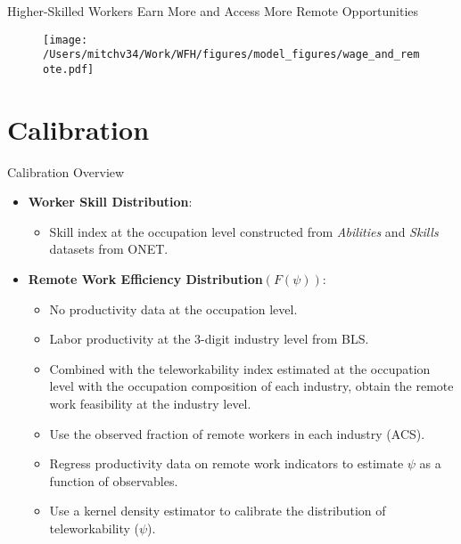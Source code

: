 \documentclass[aspectratio=1610]{beamer}
\begin{document}
\begin{frame}{Higher-Skilled Workers Earn More and Access More Remote Opportunities}
    \begin{figure}
        \centering
        \texttt{[image: /Users/mitchv34/Work/WFH/figures/model\_figures/wage\_and\_remote.pdf]}
    \end{figure}
\end{frame}

\section{Calibration}
\begin{frame}[label=calibration_overview]{Calibration Overview}
    \begin{itemize}
        \item \textbf{Worker Skill Distribution}:
        \begin{itemize}
            \item Skill index at the occupation level constructed from \textit{Abilities} and \textit{Skills} datasets from ONET.\hyperlink{appendix_worker_skill}{}
        \end{itemize}

        \item \textbf{Remote Work Efficiency Distribution}$(F(\psi))$:
        \begin{itemize}
            \item No productivity data at the occupation level.
            \item Labor productivity at the 3-digit industry level from BLS.
            \item Combined with the teleworkability index estimated at the occupation level with the occupation composition of each industry, obtain the remote work feasibility at the industry level.
            \item Use the observed fraction of remote workers in each industry (ACS).
            \item Regress productivity data on remote work indicators to estimate $\psi$ as a function of observables. \hyperlink{appendix_calibration_psi_details}{}
            \item Use a kernel density estimator to calibrate the distribution of teleworkability (\(\psi\)).
        \end{itemize}
        
    \end{itemize}
\end{frame}
\end{document}
